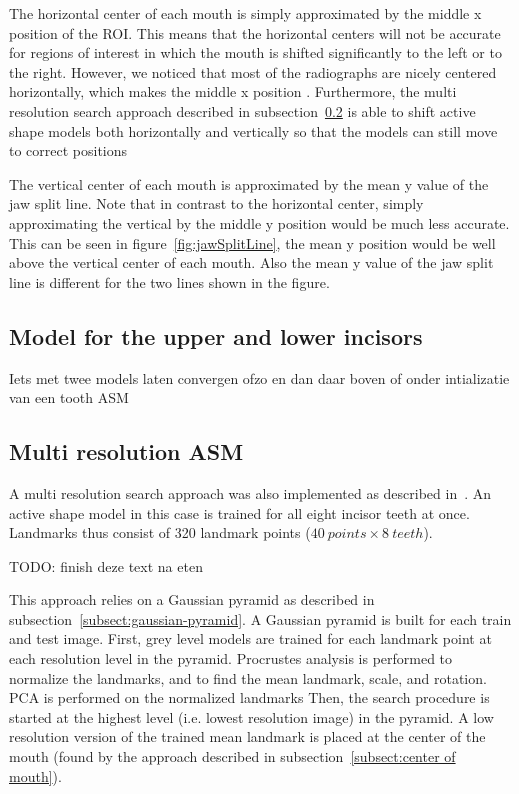 \documentclass[a4paper]{article}
\begin{document}
The horizontal center of each mouth is simply approximated by the middle x position of the ROI. This means that the horizontal centers will not be accurate for regions of interest in which the mouth is shifted significantly to the left or to the right. However, we noticed that most of the radiographs are nicely centered horizontally, which makes the middle x position .
Furthermore, the multi resolution search approach described in subsection~\ref{subsect:multi-res} is able to shift active shape models both horizontally and vertically so that the models can still move to correct positions 

The vertical center of each mouth is approximated by the mean y value of the jaw split line. Note that in contrast to the horizontal center, simply approximating the vertical by the middle y position would be much less accurate. This can be seen in figure~\ref{fig:jawSplitLine}, the mean y position would be well above the vertical center of each mouth. Also the mean y value of the jaw split line is different for the two lines shown in the figure.

\subsection{Model for the upper and lower incisors}
\label{subsect:upper-lower-incisors}
Iets met twee models laten convergen ofzo en dan daar boven of onder intializatie van een tooth ASM

\subsection{Multi resolution ASM}
\label{subsect:multi-res}
A multi resolution search approach was also implemented as described in~\cite{Cootes1992AnIT}. 
An active shape model in this case is trained for all eight incisor teeth at once.
Landmarks thus consist of 320 landmark points ($40\ points \times 8\ teeth$).

TODO: finish deze text na eten

This approach relies on a Gaussian pyramid as described in subsection~\ref{subsect:gaussian-pyramid}. 
A Gaussian pyramid is built for each train and test image.
First, grey level models are trained for each landmark point at each resolution level in the pyramid. 
Procrustes analysis is performed to normalize the landmarks, and to find the mean landmark, scale, and rotation.
PCA is performed on the normalized landmarks
Then, the search procedure is started at the highest level (i.e. lowest resolution image) in the pyramid. 
A low resolution version of the trained mean landmark is placed at the center of the mouth (found by the approach described in subsection~\ref{subsect:center of mouth}).
\end{document}
